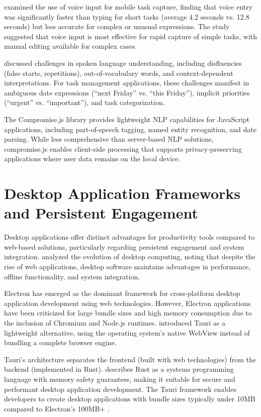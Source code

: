 \citet{myers1998use} examined the use of voice input for mobile task capture, finding that voice entry was significantly faster than typing for short tasks (average 4.2 seconds vs. 12.8 seconds) but less accurate for complex or unusual expressions. The study suggested that voice input is most effective for rapid capture of simple tasks, with manual editing available for complex cases.

\citet{glass2004natural} discussed challenges in spoken language understanding, including disfluencies (false starts, repetitions), out-of-vocabulary words, and context-dependent interpretations. For task management applications, these challenges manifest in ambiguous date expressions (``next Friday'' vs. ``this Friday''), implicit priorities (``urgent'' vs. ``important''), and task categorization.

The Compromise.js library \citationneeded provides lightweight NLP capabilities for JavaScript applications, including part-of-speech tagging, named entity recognition, and date parsing. While less comprehensive than server-based NLP solutions, compromise.js enables client-side processing that supports privacy-preserving applications where user data remains on the local device.

\section{Desktop Application Frameworks and Persistent Engagement}
\label{sec:desktop-frameworks}

\inprogress

Desktop applications offer distinct advantages for productivity tools compared to web-based solutions, particularly regarding persistent engagement and system integration. \citet{grudin2002desktops} analyzed the evolution of desktop computing, noting that despite the rise of web applications, desktop software maintains advantages in performance, offline functionality, and system integration.

Electron has emerged as the dominant framework for cross-platform desktop application development using web technologies. \citationneeded However, Electron applications have been criticized for large bundle sizes and high memory consumption due to the inclusion of Chromium and Node.js runtimes. \citet{tauri2023documentation} introduced Tauri as a lightweight alternative, using the operating system's native WebView instead of bundling a complete browser engine.

Tauri's architecture separates the frontend (built with web technologies) from the backend (implemented in Rust). \citet{klabnik2019rust} describes Rust as a systems programming language with memory safety guarantees, making it suitable for secure and performant desktop application development. The Tauri framework enables developers to create desktop applications with bundle sizes typically under 10MB compared to Electron's 100MB+ \citationneeded.

